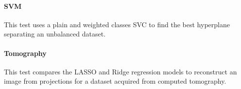\documentclass[11pt]{article}
\begin{document}


\paragraph{SVM}

This test uses a plain and weighted classes SVC to find the best hyperplane separating an unbalanced dataset.




\paragraph{Tomography}

This test compares the LASSO and Ridge regression models to 
reconstruct an image from  projections for a dataset
acquired from computed tomography.



\end{document}
